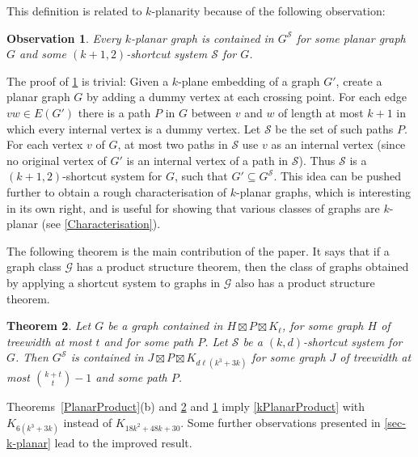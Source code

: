 \documentclass{patmorin}
\theoremstyle{plain}
\newtheorem{thm}{Theorem}
\newtheorem{obs}[thm]{Observation}
\theoremstyle{definition}
\newcommand{\note}[2]{\noindent{\color{red}[#1:~#2]}}
\newcommand{\referee}[2]{\noindent\textcolor{blue}{\framebox{\begin{minipage}{\textwidth} Ref \#{#1}: #2\end{minipage}}}}
\renewcommand{\SS}{\mathcal{S}}
\begin{document}
This definition is related to $k$-planarity because of the following observation:

\begin{obs}
\label{AddDummy}
Every $k$-planar graph is contained in $G^\SS$ for some planar graph $G$ and some $(k+1,2)$-shortcut system $\SS$ for $G$.
\end{obs}

The proof of \cref{AddDummy} is trivial: Given a $k$-plane embedding of a graph $G'$, create a planar graph $G$ by adding a dummy vertex at each crossing point. For each edge $vw\in E(G')$ there is a path $P$ in $G$ between $v$ and $w$ of length at most $k+1$ in which every internal vertex is a dummy vertex. Let $\SS$ be the set of such paths $P$. For each vertex $v$ of $G$, at most two paths in $\SS$ use $v$ as an internal vertex (since no original vertex of $G'$ is an internal vertex of a path in $\SS$). Thus $\SS$ is a $(k+1,2)$-shortcut system for $G$, such that $G'\subseteq G^\SS$. This idea can be pushed further to obtain a rough characterisation of $k$-planar graphs, which is interesting in its own right, and is useful for showing that various classes of graphs are $k$-planar (see \cref{Characterisation}).


The following theorem is the main contribution of the paper. It says that if a graph class $\mathcal{G}$ has a product structure theorem, then the class of graphs obtained by applying a shortcut system to graphs in $\mathcal{G}$ also has a product structure theorem.

\begin{thm}
\label{ShortcutProduct}
Let $G$ be a graph contained in $H\boxtimes P \boxtimes K_\ell$, for some graph $H$ of treewidth at most $t$ and for some path $P$. Let $\SS$ be a $(k,d)$-shortcut system for $G$. Then $G^\SS$ is contained in $J\boxtimes P\boxtimes K_{d\ell(k^3+3k)}$ for some graph $J$ of treewidth at most $\binom{k+t}{t}-1$ and some path $P$.
\end{thm}



Theorems~\ref{PlanarProduct}(b) and \ref{ShortcutProduct} and \cref{AddDummy} imply \cref{kPlanarProduct} with $K_{6(k^3+3k)}$ instead of $K_{18k^2+48k+30}$. Some further observations presented in \cref{sec-k-planar} lead to the improved result.
\end{document}
